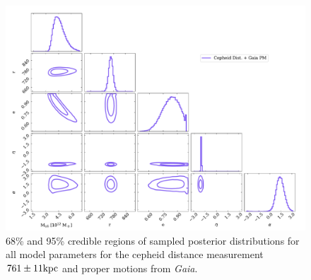 \documentclass[twocolumn]{aastex631}
\begin{document}
\begin{figure}[htb]
  \centering
  \includegraphics[width=0.8\columnwidth]{analyze-runs-all-fiducial2021.pdf}
  \caption{\label{fig:contour-fiducial}
  68\% and 95\% credible regions of sampled posterior distributions for all
  model parameters for the cepheid distance
  measurement $761\pm 11 \rm kpc$ and proper motions from \textit{Gaia}.
  }
\end{figure}

{}

\end{document}
